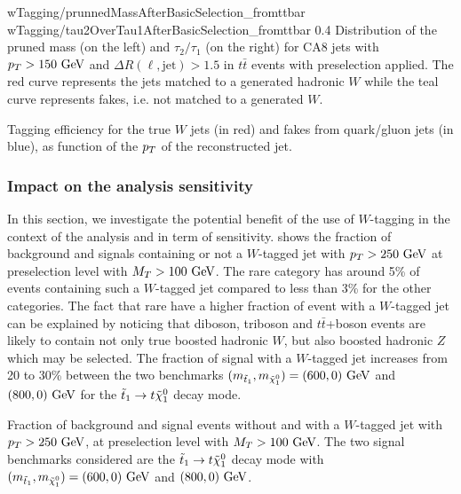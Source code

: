                      {wTagging/prunnedMassAfterBasicSelection_fromttbar}
                     {wTagging/tau2OverTau1AfterBasicSelection_fromttbar}
                     {0.4}
                     {Distribution of the pruned mass (on the left) and $\tau_2
                     / \tau_1$ (on the right) for CA8 jets with $p_T > 150~\text{GeV}$ and
                     $\Delta R(\ell,\text{jet}) > 1.5$ in $t\bar{t}$ events
                     with preselection applied. The red curve represents the
                     jets matched to a generated hadronic $W$ while the teal
                     curve represents fakes, i.e. not matched to a generated $W$.}

                 {Tagging efficiency for the true $W$ jets (in red) and fakes from quark/gluon
                 jets (in blue), as function of the $p_T$ of the reconstructed jet.}

    \subsubsection{Impact on the analysis sensitivity}

    In this section, we investigate the potential benefit of the use of $W$-tagging
    in the context of the analysis and in term of sensitivity. 
    shows the fraction of background and signals containing or not a $W$-tagged jet
    with $p_T > 250~\text{GeV}$ at preselection level with $M_T > 100~\text{GeV}$. The
    rare category has around 5\% of events containing such a $W$-tagged jet compared
    to less than 3\% for the other categories. The fact that rare have a higher
    fraction of event with a $W$-tagged jet can be explained by noticing that
    diboson, triboson and $t\bar{t}$+boson events are likely to contain not only
    true boosted hadronic $W$, but also boosted hadronic $Z$ which may be selected.
    The fraction of signal with a $W$-tagged jet increases from 20 to 30\% between
    the two benchmarks $(m_{\tilde{t}_1},m_{\tilde{\chi}_1^0}) = (600,0) ~\text{GeV}$ and
    $(800,0) ~\text{GeV}$ for the $\tilde{t}_1 \rightarrow t \tilde{\chi}_1^0$ decay mode.

                 {Fraction of background and signal events without and with a
                 $W$-tagged jet with $p_T > 250~\text{GeV}$, at preselection level with
                 $M_T > 100~\text{GeV}$. The two signal benchmarks considered are the $\tilde{t}_1
                 \rightarrow t \tilde{\chi}_1^0$ decay mode with
                 $(m_{\tilde{t}_1},m_{\tilde{\chi}_1^0}) = (600,0)~\text{GeV}$ and $(800,0)~\text{GeV}$.}


